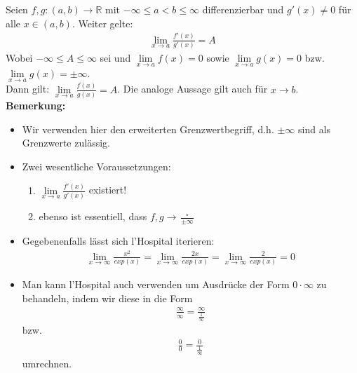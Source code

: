 \begin{Satz}{
	Seien $f,g: (a,b) \rightarrow \mathbb{R}$ mit $-\infty \leq a < b \leq \infty$
	differenzierbar und $g'(x) \neq 0$ für alle $x \in (a,b)$. Weiter gelte:
	\begin{align*}
		\lim\limits_{x \rightarrow a}{\frac{f'(x)}{g'(x)} } = A
	\end{align*}
	Wobei  $ -\infty \leq A \leq \infty$ sei und 
	$\lim\limits_{x \rightarrow a}{f(x) = 0} $ 
	sowie 
	$\lim\limits_{x \rightarrow a}{g(x) = 0} $
	bzw. $\lim\limits_{x\rightarrow a}{g(x) = \pm \infty}$.\\
	Dann gilt: $\lim\limits_{x \rightarrow a}{\frac{f(x)}{g(x)} = A}$.
	Die analoge Aussage gilt auch für $x \rightarrow b$. \\
	\textbf{Bemerkung:}
	\begin{itemize}
		\item Wir verwenden hier den erweiterten Grenzwertbegriff, d.h. $\pm \infty$ 
		sind als Grenzwerte zulässig.
		\item Zwei wesentliche Voraussetzungen:
			\begin{enumerate}
				\item $\lim\limits_{x \rightarrow a}
				{\frac{f'(x)}{g'(x)}}$ existiert!
				\item ebenso ist essentiell, dass $f,g \rightarrow 
				\frac{\circ }{\pm \infty}$
			\end{enumerate}
		\item Gegebenenfalls lässt sich l'Hospital iterieren:
		\begin{align*}
			\lim\limits_{x \rightarrow \infty}{\frac{x^2}{exp(x)}} = 
			\lim\limits_{x \rightarrow \infty}{\frac{2x}{exp(x)}} = 
			\lim\limits_{x \rightarrow \infty}{\frac{2}{exp(x)}} = 0
		\end{align*}
		\item Man kann l'Hospital auch verwenden um Ausdrücke der Form 
		$0 \cdot \infty$ zu behandeln, indem wir diese in die Form
		\begin{align*}
		 	\frac{\infty}{\infty} = \frac{\infty}{\frac{1}{\infty}}
		\end{align*}
		bzw. 
		\begin{align*}
			\frac{0}{0} = \frac{0}{\frac{1}{\infty}}
		\end{align*}
		umrechnen.
	\end{itemize}
	
}
\end{Satz}
